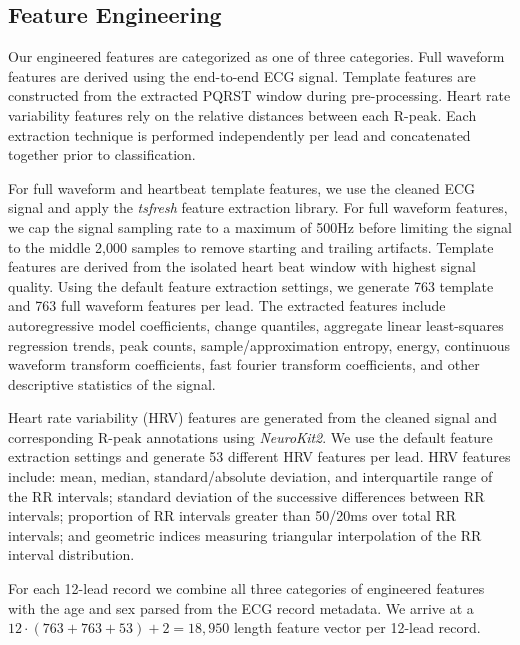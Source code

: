 \documentclass[twocolumn]{cinc}
\begin{document}
\subsection{Feature Engineering}

Our engineered features are categorized as one of three categories.
Full waveform features are derived using the end-to-end ECG signal.
Template features are constructed from the extracted PQRST window during pre-processing.
Heart rate variability features rely on the relative distances between each R-peak.
Each extraction technique is performed independently per lead and concatenated together prior to classification.

For full waveform and heartbeat template features, we use the cleaned ECG signal and apply the \emph{tsfresh} feature extraction library.
For full waveform features, we cap the signal sampling rate to a maximum of 500Hz before limiting the signal to the middle 2,000 samples to remove starting and trailing artifacts.
Template features are derived from the isolated heart beat window with highest signal quality.
Using the default feature extraction settings, we generate 763 template and 763 full waveform features per lead.
The extracted features include autoregressive model coefficients, change quantiles, aggregate linear least-squares regression trends, peak counts, sample/approximation entropy, energy, continuous waveform transform coefficients, fast fourier transform coefficients, and other descriptive statistics of the signal.

Heart rate variability (HRV) features are generated from the cleaned signal and corresponding R-peak annotations using \emph{NeuroKit2}.
We use the default feature extraction settings and generate 53 different HRV features per lead.
HRV features include: mean, median, standard/absolute deviation, and interquartile range of the RR intervals; standard deviation of the successive differences between RR intervals; proportion of RR intervals greater than 50/20ms over total RR intervals; and geometric indices measuring triangular interpolation of the RR interval distribution.

For each 12-lead record we combine all three categories of engineered features with the age and sex parsed from the ECG record metadata.
We arrive at a $12 \cdot (763 + 763 + 53) + 2 = 18,950$ length feature vector per 12-lead record.
\end{document}
